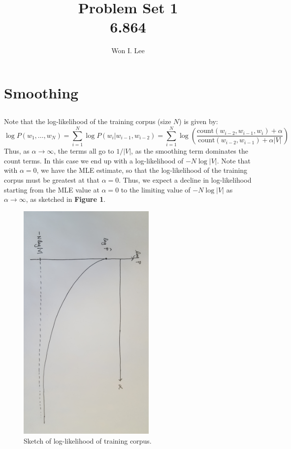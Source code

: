 \documentclass[psamsfonts]{amsart}
\title{Problem Set 1 \\ 6.864}
\author{Won I. Lee}
\theoremstyle{definition}
\theoremstyle{remark}
\numberwithin{equation}{section}
\begin{document}
	
\maketitle

\section{Smoothing}

\subsection{} Note that the log-likelihood of the training corpus (size $N$) is given by:
$$\log P(w_1, \dots, w_N) = \sum_{i=1}^N \log P(w_i|w_{i-1}, w_{i-2}) = \sum_{i=1}^N \log\left(\frac{\text{count}(w_{i-2}, w_{i-1}, w_i) + \alpha}{\text{count}(w_{i-2}, w_{i-1}) + \alpha |V|}\right)$$
Thus, as $\alpha\rightarrow\infty$, the terms all go to $1/|V|$, as the smoothing term dominates the count terms. In this case we end up with a log-likelihood of $-N\log|V|$. Note that with $\alpha = 0$, we have the MLE estimate, so that the log-likelihood of the training corpus must be greatest at that $\alpha = 0$. Thus, we expect a decline in log-likelihood starting from the MLE value at $\alpha = 0$ to the limiting value of $-N\log|V|$ as $\alpha \rightarrow \infty$, as sketched in {\bf Figure 1}.

\begin{figure}
	\includegraphics[width=0.6\textwidth]{1-1.jpg}
	\caption{Sketch of log-likelihood of training corpus.}
\end{figure}
\end{document}
